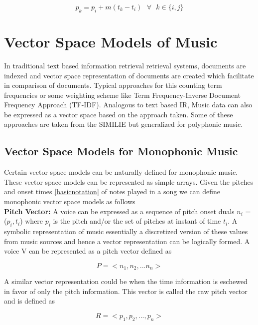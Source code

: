 \begin{equation}
p_k = p_i + m(t_k - t_i) \ \ \ \forall \ \ \ k \in \{i, j\}
\end{equation}
 
\section{Vector Space Models of Music}

\noindent In traditional text based information retrieval retrieval systems, documents are indexed and vector space representation of documents are created which facilitate in comparison of documents. Typical approaches for this counting term frequencies or some weighting scheme like Term Frequency-Inverse Document Frequency Approach (TF-IDF). Analogous to text based IR, Music data can also be expressed as a vector space based on the approach taken. Some of these approaches are taken from the SIMILIE \cite{similietechnicalmanual} but generalized for polyphonic music.

\subsection{Vector Space Models for Monophonic Music}

\noindent Certain vector space models can be naturally defined for monophonic music. These vector space models can be represented as simple arrays. Given the pitches and onset times \ref{basicnotation} of notes played in a song we can define monophonic vector space models as follows \\
 
\noindent \textbf{Pitch Vector:} A voice can be expressed as a sequence of pitch onset duals $n_i$ = ($p_i, t_i$) where $p_i$ is the pitch and/or the set of pitches at instant of time $t_i$. A symbolic representation of music essentially a discretized version of these values from music sources and hence a vector representation can be logically formed. A voice V can be represented as a pitch vector defined as

\begin{equation}
P = <n_1, n_2, ... n_n>
\end{equation}

\noindent A similar vector representation could be when the time information is eschewed in favor of only the pitch information. This vector is called the raw pitch vector and is defined as

\begin{equation} \label{eq:rawpitch}
R = <p_1, p_2, ..., p_n>
\end{equation}

